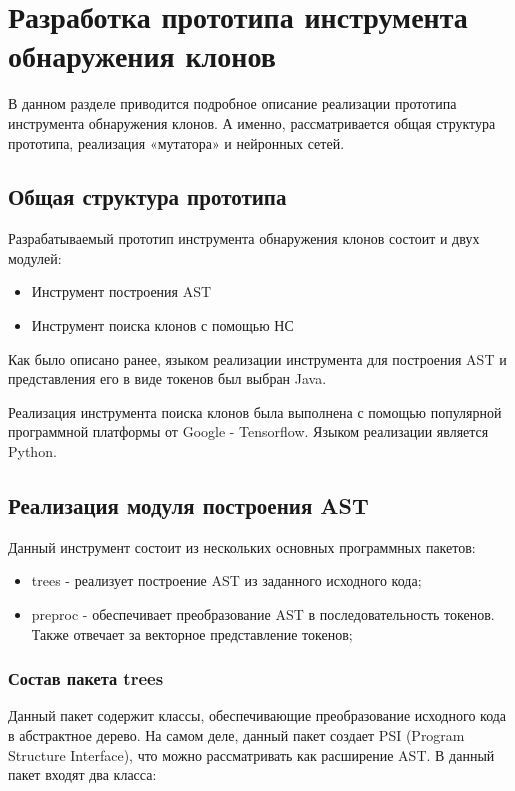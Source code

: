 \chapter{Разработка прототипа инструмента обнаружения клонов}

В данном разделе приводится подробное описание реализации прототипа инструмента обнаружения клонов. А именно, рассматривается общая структура прототипа, реализация «мутатора»  и нейронных сетей.

\section{Общая структура прототипа}

Разрабатываемый прототип инструмента обнаружения клонов состоит и двух модулей:
\begin{itemize}
\setlength\itemsep{0mm}
\item Инструмент построения AST
\item Инструмент поиска клонов с помощью НС
\end{itemize}

Как было описано ранее, языком реализации инструмента для построения AST и представления его в виде токенов был выбран Java.

Реализация инструмента поиска клонов была выполнена с помощью популярной программной платформы от Google -  Tensorflow. Языком реализации является Python.

\section{Реализация модуля построения AST}

Данный инструмент состоит из нескольких основных программных пакетов:

\begin{itemize}
\setlength\itemsep{0mm}
\item trees - реализует построение AST из заданного исходного кода;
\item preproc - обеспечивает преобразование AST в последовательность токенов. Также отвечает за векторное представление токенов;
\end{itemize}

\subsection{Состав пакета trees}

Данный пакет содержит классы, обеспечивающие преобразование исходного кода в абстрактное дерево. На самом деле, данный пакет создает PSI (Program Structure Interface), что можно рассматривать как расширение AST. В данный пакет входят два класса:

